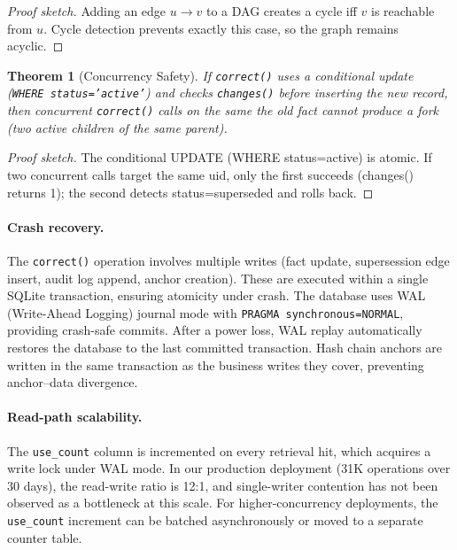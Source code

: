 \documentclass{article}
\newtheorem{theorem}{Theorem}
\begin{document}
\begin{proof}[Proof sketch]
Adding an edge $u \to v$ to a DAG creates a cycle iff $v$ is reachable from $u$. Cycle detection prevents exactly this case, so the graph remains acyclic.
\end{proof}

\begin{theorem}[Concurrency Safety]
\label{theorem:concurrency}
If \texttt{correct()} uses a conditional update (\texttt{WHERE status='active'}) and checks \texttt{changes()} before inserting the new record, then concurrent \texttt{correct()} calls on the same the old fact cannot produce a fork (two active children of the same parent).
\end{theorem}

\begin{proof}[Proof sketch]
The conditional UPDATE (WHERE status=active) is atomic. If two concurrent calls target the same uid, only the first succeeds (changes() returns 1); the second detects status=superseded and rolls back.
\end{proof}

\paragraph{Crash recovery.} The \texttt{correct()} operation involves multiple writes (fact update, supersession edge insert, audit log append, anchor creation). These are executed within a single SQLite transaction, ensuring atomicity under crash. The database uses WAL (Write-Ahead Logging) journal mode with \texttt{PRAGMA synchronous=NORMAL}, providing crash-safe commits. After a power loss, WAL replay automatically restores the database to the last committed transaction. Hash chain anchors are written in the same transaction as the business writes they cover, preventing anchor--data divergence.

\paragraph{Read-path scalability.} The \texttt{use\_count} column is incremented on every retrieval hit, which acquires a write lock under WAL mode. In our production deployment (31K operations over 30 days), the read-write ratio is 12:1, and single-writer contention has not been observed as a bottleneck at this scale. For higher-concurrency deployments, the \texttt{use\_count} increment can be batched asynchronously or moved to a separate counter table.
\end{document}
